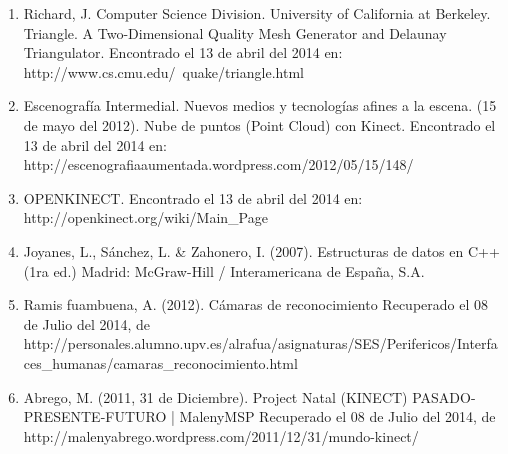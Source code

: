 \documentclass[letterpaper]{article}
\begin{document}
\begin{enumerate}

\item Richard, J. Computer Science Division. University of California at Berkeley. Triangle. A Two-Dimensional Quality Mesh Generator and 
Delaunay Triangulator. Encontrado el 13 de abril del 2014 en: http://www.cs.cmu.edu/~quake/triangle.html
\item Escenografía Intermedial. Nuevos medios y tecnologías afines a la escena. (15 de mayo del 2012).
Nube de puntos (Point Cloud) con Kinect. Encontrado el 13 de abril del 2014 en: http://escenografiaaumentada.wordpress.com/2012/05/15/148/
\item OPENKINECT. Encontrado el 13 de abril del 2014 en: http://openkinect.org/wiki/Main\_Page
\item Joyanes, L., Sánchez, L. \& Zahonero, I. (2007). Estructuras de datos en C++ (1ra ed.) Madrid: McGraw-Hill / Interamericana de España, S.A.
\item Ramis fuambuena, A. (2012). Cámaras de reconocimiento Recuperado el 08 de Julio del 2014, de http://personales.alumno.upv.es/alrafua/asignaturas/SES/Perifericos/Interfaces\_humanas/camaras\_reconocimiento.html
\item Abrego, M. (2011, 31 de Diciembre). Project Natal (KINECT) PASADO-PRESENTE-FUTURO | MalenyMSP Recuperado el 08 de Julio del 2014, de http://malenyabrego.wordpress.com/2011/12/31/mundo-kinect/


\end{enumerate}

	
\end{document}
